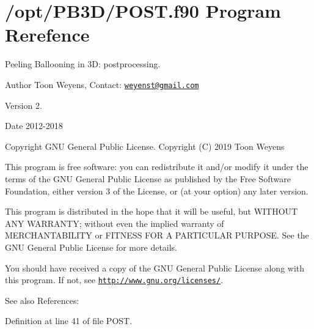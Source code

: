 \hypertarget{POST_8f90}{}\section{/opt/\+P\+B3\+D/\+P\+O\+ST.f90 Program Rerefence}
\label{POST_8f90}



Peeling Ballooning in 3D\+: postprocessing. 

\begin{DoxyAuthor}{Author}
Toon Weyens, Contact\+: \href{mailto:weyenst@gmail.com}{\tt weyenst@gmail.\+com} 
\end{DoxyAuthor}
\begin{DoxyVersion}{Version}
2. 
\end{DoxyVersion}
\begin{DoxyDate}{Date}
2012-\/2018 
\end{DoxyDate}
\begin{DoxyCopyright}{Copyright}
G\+NU General Public License. Copyright (C) 2019 Toon Weyens
\end{DoxyCopyright}
This program is free software\+: you can redistribute it and/or modify it under the terms of the G\+NU General Public License as published by the Free Software Foundation, either version 3 of the License, or (at your option) any later version.

This program is distributed in the hope that it will be useful, but W\+I\+T\+H\+O\+UT A\+NY W\+A\+R\+R\+A\+N\+TY; without even the implied warranty of M\+E\+R\+C\+H\+A\+N\+T\+A\+B\+I\+L\+I\+TY or F\+I\+T\+N\+E\+SS F\+OR A P\+A\+R\+T\+I\+C\+U\+L\+AR P\+U\+R\+P\+O\+SE. See the G\+NU General Public License for more details.

You should have received a copy of the G\+NU General Public License along with this program. If not, see \href{http://www.gnu.org/licenses/}{\tt http\+://www.\+gnu.\+org/licenses/}. \begin{DoxySeeAlso}{See also}
References\+: \cite{weyens2014theory} \cite{Weyens2017PB3D} 
\end{DoxySeeAlso}


Definition at line 41 of file P\+O\+S\+T.

